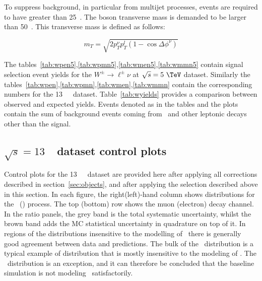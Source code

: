 To suppress background, in particular from multijet processes,
events are required to have \MET{} greater than 25~\GeV{}.
The \Wboson{} boson transverse mass \mt{} is demanded to be larger than 50~\GeV.
This transverse mass is defined as follows:

\begin{equation}\label{eq:mt}
{m}_{T} = \sqrt{2 {p}_{T}^{\nu}p_{T} ^{l} (1-\cos\Delta\phi^{\nu})}
\end{equation}

The tables~\ref{tab:wpen5},\ref{tab:wpmn5},\ref{tab:wmen5},\ref{tab:wmmn5} contain signal selection event yields for the $W^{\pm} \rightarrow \ell^{\pm}\nu$  at $\sqrt{s} = 5~\TeV$ \lowmu dataset. Similarly the tables~\ref{tab:wpen},\ref{tab:wpmn},\ref{tab:wmen},\ref{tab:wmmn} contain the corresponding numbers for the 13~\TeV\ \lowmu\ dataset. Table~\ref{tab:wyields} provides a comparison between observed and expected yields.
Events denoted as \Wln{} in the tables and the plots contain the sum of background events coming from \Wtaunu\ and other \Wboson{} leptonic decays other than the signal.






\subsection{$\sqrt{s} = 13$~\TeV\ dataset control plots}
\label{subsec:controlplots13}
Control plots for the 13~\TeV\ \lowmu\ dataset are provided here after applying all corrections described in section~\ref{sec:objects}, and after applying the selection described above in this section. In each figure, the right(left)-hand column shows distributions for the \Wplus\ (\Wminus) process. The top (bottom) row shows the muon (electron) decay channel. In the ratio panels, the grey band is the total systematic uncertainty, whilst the brown band adds the MC statistical uncertainty in quadrature on top of it. In regions of the distributions insensitive to the modelling of \ptw\ there is generally good agreement between data and predictions. The bulk of the \mt\ distribution is a typical example of distribution that is mostly insensitive to the modeling of \ptw. The \ut\ distribution is an exception, and it can therefore be concluded that the baseline simulation is not modeling \ptw\ satisfactorily.
\newpage


